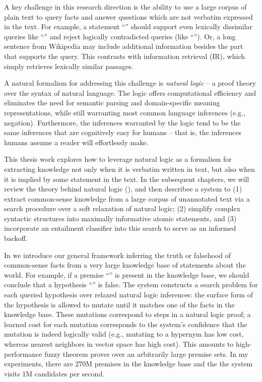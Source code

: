 A key challenge in this research direction is the ability to use a large 
  corpus of plain text to query facts and answer questions which are not verbatim 
  expressed in the text.
For example, a statement ``'' should support even lexically 
  dissimilar queries like ``'' and reject logically 
  contradicted queries (like ``'').
Or, a long sentence from Wikipedia may include additional information besides 
  the part that supports the query.
This contrasts with information retrieval (IR), which simply retrieves lexically 
  similar passages.

A natural formalism for addressing this challenge is \textit{natural logic} -- a proof 
  theory over the syntax of natural language.
The logic offers computational efficiency and eliminates the need for semantic 
  parsing and domain-specific meaning representations, while still warranting most 
  common language inferences (e.g., negation). 
Furthermore, the inferences warranted by the logic tend to be 
  the same inferences that are cognitively easy for humans -- that is, 
  the inferences humans assume a reader will effortlessly make.

This thesis work explores how to leverage natural logic as a formalism for
  extracting knowledge not only when it is verbatim written in text, but also when
  it is implied by some statement in the text.
In the subsequent chapters, we will review the theory behind natural logic
  (), and then describee a system to
  (1) extract common-sense knowledge from a large corpus of unannotated text via 
    a search procedure over a soft relaxation of natural logic;
  (2) simplify complex syntactic structures into maximally informative atomic
    statements, and
  (3) incorporate an entailment classifier into this search to serve as an
    informed backoff.


%
%

In  we introduce our general framework inferring the truth or 
  falsehood of common-sense facts from a very large knowledge base 
  of statements about the world.
For example, if a premise ``'' is present in the knowledge 
  base, we should conclude that a hypothesis ``'' is false.
The system constructs a search problem for each queried hypothesis over relaxed 
  natural logic inferences: the surface form of the hypothesis is allowed to mutate 
  until it matches one of the facts in the knowledge base.
These mutations correspond to steps in a natural logic proof; a learned cost for each 
  mutation corresponds to the system's confidence that the mutation is indeed 
  logically valid (e.g., mutating to a hypernym has low cost, whereas 
  nearest neighbors in vector space has high cost).
This amounts to high-performance fuzzy theorem prover over an arbitrarily 
  large premise sets. 
In my experiments, there are 
  270M premises in the knowledge base
  and the the system visits 1M candidates per second.

